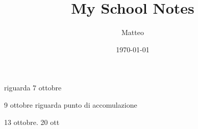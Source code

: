 \documentclass[12pt]{article}
\title{My School Notes}
\author{Matteo}
\date{\today}
\begin{document}
\maketitle

\section{}

riguarda 7 ottobre

9 ottobre riguarda punto di accomulazione

13 ottobre.
20 ott
\end{document}
